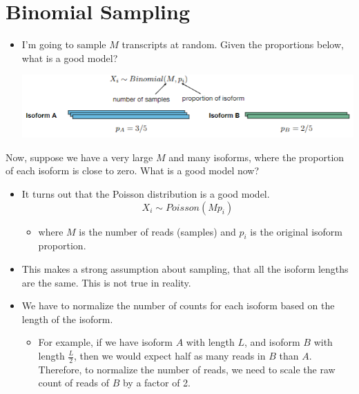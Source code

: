 \documentclass[10pt]{article}
\begin{document}
\section*{Binomial Sampling}
\begin{itemize}
    \item I'm going to sample $M$ transcripts at random.  Given the proportions below, what is a good model?
    \begin{center}
        \includegraphics*[scale=1]{W3_5.png}
    \end{center}
\end{itemize}
Now, suppose we have a very large $M$ and many isoforms, where the proportion of each isoform is close to zero.  What is a good model now?
\begin{itemize}
    \item It turns out that the Poisson distribution is a good model.
    \[X_i \sim Poisson(Mp_i)\]
    \begin{itemize}
        \item where $M$ is the number of reads (samples) and $p_i$ is the original isoform proportion.
    \end{itemize}
    \item This makes a strong assumption about sampling, that all the isoform lengths are the same.  This is not true in reality.
    \item We have to normalize the number of counts for each isoform based on the length of the isoform.
    \begin{itemize}
        \item For example, if we have isoform $A$ with length $L$, and isoform $B$ with length $\frac{L}{2}$, then we would expect half as many reads in $B$ than $A$.  Therefore, to normalize the number of reads, we need to scale the raw count of reads of $B$ by a factor of 2.
    \end{itemize}
\end{itemize}
\end{document}
